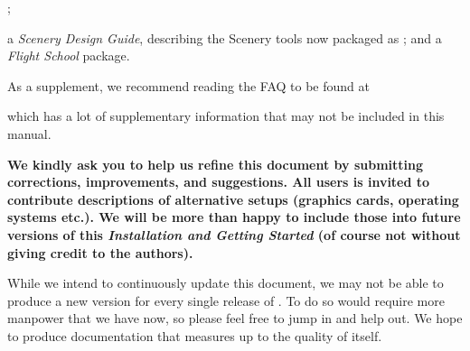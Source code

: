 ;
 \medskip

 \noindent
a \textit{\FlightGear{} Scenery Design Guide},
describing the Scenery tools now packaged as \TerraGear{}; and a \textit{\FlightGear{}
Flight School} package.
 \medskip

As a supplement, we recommend reading the \FlightGear{} FAQ to be found at


which has a lot of supplementary information that may not be included in this manual.

\textbf{We kindly ask you to help us refine this document by submitting corrections,
improvements, and suggestions. All users is invited to contribute descriptions of alternative
setups (graphics cards, operating systems etc.). We will be more than happy to include
those into future versions of this \textit{Installation and Getting Started} (of course
not without giving credit to the authors).}

While we intend to continuously update this document, we may not be able to produce a
new version for every single release of {\FlightGear{}}.  To do so would require more
manpower that we have now, so please feel free to jump in and help out.  We hope to
produce documentation that measures up to the quality of \FlightGear{} itself.


